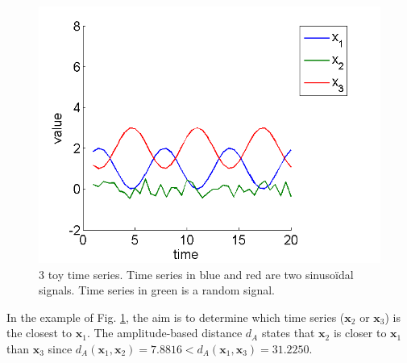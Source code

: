 \begin{figure}[h!]
\centering
\includegraphics[width=0.6\linewidth]{images/ExampleTimeSeriesMetrics3}
\caption{3 toy time series. Time series in blue and red are two sinusoïdal signals. Time series in green is a random signal.}
\label{fig:ExampleTimeSeriesMetrics3}
\end{figure}

In the example of Fig. \ref{fig:ExampleTimeSeriesMetrics3}, the aim is  to determine which time series ($\textbf{x}_2$ or $\textbf{x}_3$) is the closest to $\textbf{x}_1$. The amplitude-based distance $d_A$ states that $\textbf{x}_2$ is closer to $\textbf{x}_1$ than $\textbf{x}_3$ since $d_A(\textbf{x}_1,\textbf{x}_2) = 7.8816 < d_A(\textbf{x}_1,\textbf{x}_3)= 31.2250$.




